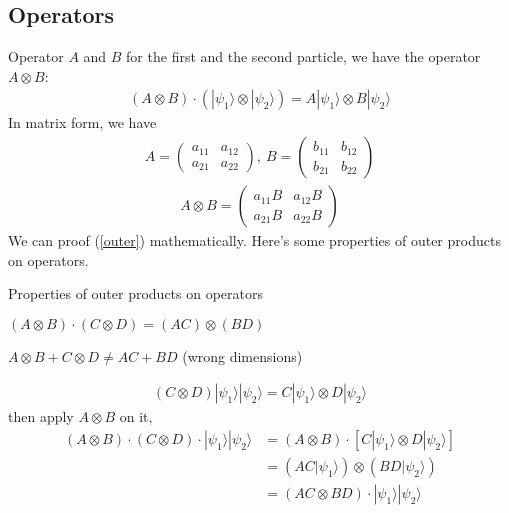 \documentclass[UTF8,12pt]{article} %
\makeatletter
\newenvironment{proof}[1][\protect\proofname]{\par
\normalfont\topsep6\p@\@plus6\p@\relax
\trivlist
\itemindent\parindent
\item[\hskip\labelsep
\scshape
#1]\ignorespaces
}{%
\endtrivlist\@endpefalse
}
\renewcommand{\proofname}{\it{Solution}}
\makeatother
\begin{document}
\subsection{Operators}
Operator $A$ and $B$ for the first and the second particle, we have the operator $A\otimes B$:
\begin{align}\label{outer}
\left(A\otimes B\right)\cdot \left(|\psi_1\rangle\otimes|\psi_2\rangle\right) = A|\psi_1\rangle\otimes B|\psi_2\rangle
\end{align}
In matrix form, we have 
\begin{align}
A = \begin{pmatrix}a_{11} & a_{12}\\a_{21} & a_{22}\end{pmatrix},~ B = \begin{pmatrix}b_{11}&b_{12}\\b_{21}&b_{22}\end{pmatrix}
\end{align}
\begin{align}
A\otimes B = \begin{pmatrix}a_{11}B&a_{12}B\\a_{21}B&a_{22}B\end{pmatrix}
\end{align}
We can proof (\ref{outer}) mathematically. Here's some properties of outer products on operators.
\begin{myboxes}{Properties of outer products on operators}{}
\begin{enumerate*}
\item $\left(A\otimes B\right)\cdot\left(C\otimes D\right) = (AC)\otimes (BD)$
\item $A\otimes B + C\otimes D \ne AC + BD$ (wrong dimensions)
\end{enumerate*}
\end{myboxes}
\begin{proof}[Proof]
\begin{align}
(C\otimes D)|\psi_1\rangle|\psi_2\rangle = C|\psi_{1}\rangle\otimes D|\psi_{2}\rangle
\end{align}
then apply $A\otimes B$ on it,
\begin{align}
\left(A\otimes B\right)\cdot\left(C\otimes D\right)\cdot|\psi_1\rangle|\psi_2\rangle &= \left(A\otimes B\right)\cdot \left[C|\psi_{1}\rangle\otimes D|\psi_{2}\rangle\right]\\
&= (AC|\psi_{1}\rangle)\otimes(BD|\psi_{2}\rangle)\\
&= (AC\otimes BD)\cdot|\psi_{1}\rangle|\psi_{2}\rangle
\end{align}
\end{proof}
\end{document}
